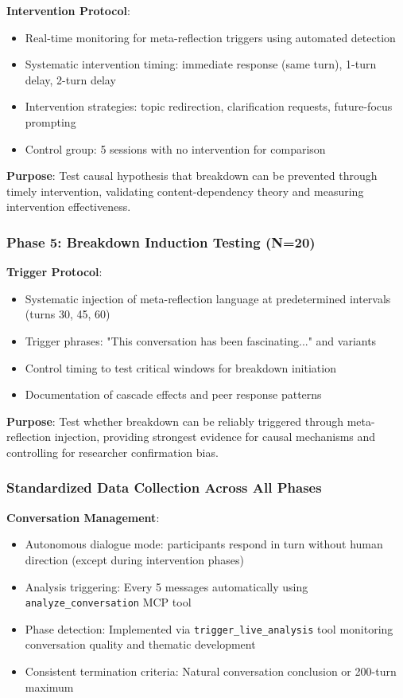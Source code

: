 \documentclass[11pt,letterpaper]{article}
\begin{document}
\textbf{Intervention Protocol}:
\begin{itemize}
    \item Real-time monitoring for meta-reflection triggers using automated detection
    \item Systematic intervention timing: immediate response (same turn), 1-turn delay, 2-turn delay
    \item Intervention strategies: topic redirection, clarification requests, future-focus prompting
    \item Control group: 5 sessions with no intervention for comparison
\end{itemize}

\textbf{Purpose}: Test causal hypothesis that breakdown can be prevented through timely intervention, validating content-dependency theory and measuring intervention effectiveness.

\subsubsection{Phase 5: Breakdown Induction Testing (N=20)}

\textbf{Trigger Protocol}:
\begin{itemize}
    \item Systematic injection of meta-reflection language at predetermined intervals (turns 30, 45, 60)
    \item Trigger phrases: "This conversation has been fascinating..." and variants
    \item Control timing to test critical windows for breakdown initiation
    \item Documentation of cascade effects and peer response patterns
\end{itemize}

\textbf{Purpose}: Test whether breakdown can be reliably triggered through meta-reflection injection, providing strongest evidence for causal mechanisms and controlling for researcher confirmation bias.

\subsubsection{Standardized Data Collection Across All Phases}

\textbf{Conversation Management}:
\begin{itemize}
    \item Autonomous dialogue mode: participants respond in turn without human direction (except during intervention phases)
    \item Analysis triggering: Every 5 messages automatically using \texttt{analyze\_conversation} MCP tool
    \item Phase detection: Implemented via \texttt{trigger\_live\_analysis} tool monitoring conversation quality and thematic development
    \item Consistent termination criteria: Natural conversation conclusion or 200-turn maximum
\end{itemize}
\end{document}
